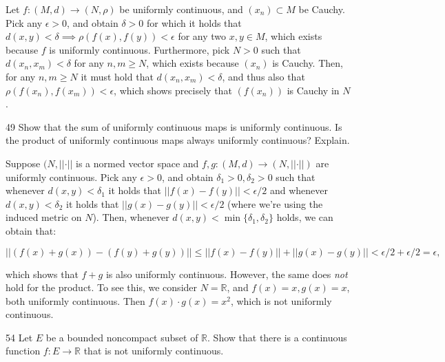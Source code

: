 \begin{solution}
    
    Let $f: (M, d) \rightarrow (N, \rho)$ be uniformly continuous, and $(x_n) \subset M$ be Cauchy.
    Pick any $\epsilon > 0$, and obtain $\delta > 0$ for which it holds that $d(x, y) < \delta \implies \rho(f(x), f(y)) < \epsilon$ for any two $x, y \in M$, which exists because $f$ is uniformly continuous.
    Furthermore, pick $N > 0$ such that $d(x_n, x_m) < \delta$ for any $n, m \geq N$, which exists because $(x_n)$ is Cauchy.
    Then, for any $n, m \geq N$ it must hold that $d(x_n, x_m) < \delta$, and thus also that $\rho(f(x_n), f(x_m)) < \epsilon$, which shows precisely that $(f(x_n))$ is Cauchy in $N$.
\end{solution}

\begin{exercise}{49}
    Show that the sum of uniformly continuous maps is uniformly continuous.
    Is the product of uniformly continuous maps always uniformly continuous?
    Explain.
\end{exercise}

\begin{solution}
    
    Suppose $(N, \lvert \lvert \cdot \rvert \rvert$ is a normed vector space and $f, g: (M, d) \rightarrow (N, \lvert \lvert \cdot \rvert \rvert)$ are uniformly continuous.
    Pick any $\epsilon > 0$, and obtain $\delta_1 > 0, \delta_2 > 0$ such that whenever $d(x, y) < \delta_1$ it holds that $\lvert \lvert f(x) - f(y) \rvert \rvert < \epsilon/2$ and whenever $d(x, y) < \delta_2$ it holds that $\lvert \lvert g(x) - g(y) \rvert \rvert < \epsilon/2$ (where we're using the induced metric on $N$).
    Then, whenever $d(x, y) < \min\{\delta_1, \delta_2\}$ holds, we can obtain that:

    \[\lvert \lvert (f(x) + g(x)) - (f(y) + g(y)) \rvert \rvert \leq \lvert \lvert f(x) - f(y) \rvert \rvert + \lvert \lvert g(x) - g(y) \rvert \rvert < \epsilon/2 + \epsilon/2 = \epsilon,\]

    which shows that $f + g$ is also uniformly continuous.
    However, the same does \textit{not} hold for the product.
    To see this, we consider $N = \mathbb{R}$, and $f(x) = x, g(x) = x$, both uniformly continuous.
    Then $f(x) \cdot g(x) = x^2$, which is not uniformly continuous.
\end{solution}

\newpage

\begin{exercise}{54}
    Let $E$ be a bounded noncompact subset of $\mathbb{R}$.
    Show that there is a continuous function $f: E \rightarrow \mathbb{R}$ that is not uniformly continuous.
\end{exercise}

